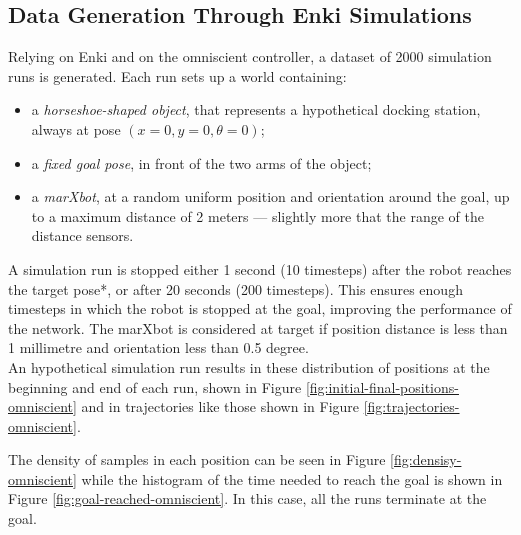 \subsection{Data Generation Through Enki Simulations}
Relying on Enki and on the omniscient controller, a dataset of 2000 simulation 
runs is generated. 
Each run sets up a world containing:
\begin{itemize}
	\item a \emph{horseshoe-shaped object}, that represents a hypothetical 
	docking 
	station, always at pose $(x=0, y=0, \theta=0)$;
	\item a \emph{fixed goal pose}, in front of the two arms of the object;
	\item a \emph{marXbot}, at a random uniform position and orientation 
	around the 
	goal, up to a maximum distance of 2 meters --- slightly more that the range 
	of the distance sensors.\\
\end{itemize}

A simulation run is stopped either 1 second (10 timesteps) after the robot 
reaches the target pose*, or after 20 seconds (200 timesteps). This ensures 
enough timesteps in which the robot is stopped at the goal, improving 
the performance of the network. The marXbot is considered at target if position 
distance is less than 1 millimetre and orientation less than 0.5 degree.
\\

An hypothetical simulation run results in these distribution of positions at 
the beginning and end of each run, shown 
in Figure \ref{fig:initial-final-positions-omniscient} and in trajectories like 
those shown in Figure 
\ref{fig:trajectories-omniscient}.
%
%

The density of samples in each position can be seen in Figure 
\ref{fig:densisy-omniscient} while the histogram of the time needed to reach 
the goal is shown in Figure \ref{fig:goal-reached-omniscient}. In this case, 
all the runs terminate at the goal.\\

